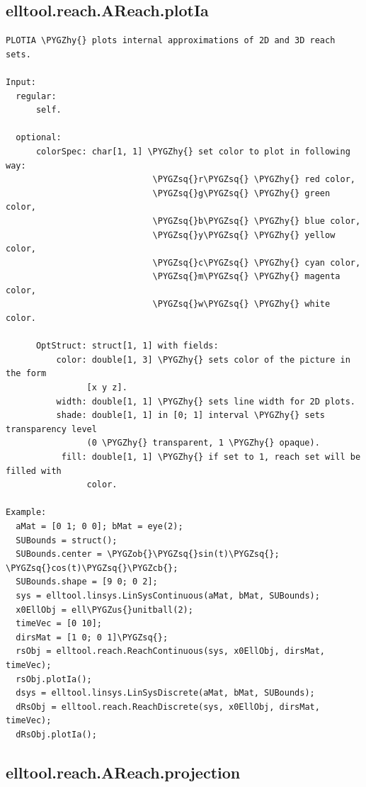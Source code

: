 \documentclass[letterpaper,10pt,english]{sphinxmanual}
\def\PYGZus{\char`\_}
\def\PYGZob{\char`\{}
\def\PYGZcb{\char`\}}
\def\PYGZhy{\char`\-}
\def\PYGZsq{\char`\'}
\begin{document}
\subsection{elltool.reach.AReach.plotIa}
\label{chap_functions:elltool-reach-areach-plotia}
\begin{Verbatim}[commandchars=\\\{\}]
PLOTIA \PYGZhy{} plots internal approximations of 2D and 3D reach sets.

Input:
  regular:
      self.

  optional:
      colorSpec: char[1, 1] \PYGZhy{} set color to plot in following way:
                             \PYGZsq{}r\PYGZsq{} \PYGZhy{} red color,
                             \PYGZsq{}g\PYGZsq{} \PYGZhy{} green color,
                             \PYGZsq{}b\PYGZsq{} \PYGZhy{} blue color,
                             \PYGZsq{}y\PYGZsq{} \PYGZhy{} yellow color,
                             \PYGZsq{}c\PYGZsq{} \PYGZhy{} cyan color,
                             \PYGZsq{}m\PYGZsq{} \PYGZhy{} magenta color,
                             \PYGZsq{}w\PYGZsq{} \PYGZhy{} white color.

      OptStruct: struct[1, 1] with fields:
          color: double[1, 3] \PYGZhy{} sets color of the picture in the form
                [x y z].
          width: double[1, 1] \PYGZhy{} sets line width for 2D plots.
          shade: double[1, 1] in [0; 1] interval \PYGZhy{} sets transparency level
                (0 \PYGZhy{} transparent, 1 \PYGZhy{} opaque).
           fill: double[1, 1] \PYGZhy{} if set to 1, reach set will be filled with
                color.

Example:
  aMat = [0 1; 0 0]; bMat = eye(2);
  SUBounds = struct();
  SUBounds.center = \PYGZob{}\PYGZsq{}sin(t)\PYGZsq{}; \PYGZsq{}cos(t)\PYGZsq{}\PYGZcb{};
  SUBounds.shape = [9 0; 0 2];
  sys = elltool.linsys.LinSysContinuous(aMat, bMat, SUBounds);
  x0EllObj = ell\PYGZus{}unitball(2);
  timeVec = [0 10];
  dirsMat = [1 0; 0 1]\PYGZsq{};
  rsObj = elltool.reach.ReachContinuous(sys, x0EllObj, dirsMat, timeVec);
  rsObj.plotIa();
  dsys = elltool.linsys.LinSysDiscrete(aMat, bMat, SUBounds);
  dRsObj = elltool.reach.ReachDiscrete(sys, x0EllObj, dirsMat, timeVec);
  dRsObj.plotIa();
\end{Verbatim}


\subsection{elltool.reach.AReach.projection}
\label{chap_functions:elltool-reach-areach-projection}
\end{document}
